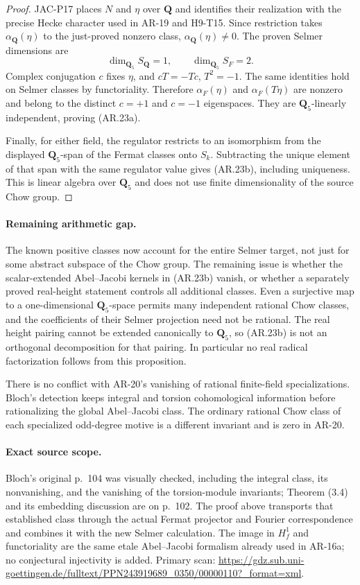 \begin{proof}
JAC-P17 places $N$ and $\eta$ over $\mathbf Q$ and identifies their
realization with the precise Hecke character used in AR-19 and
H9-T15.  Since restriction takes
$\alpha_{\mathbf Q}(\eta)$ to the just-proved nonzero class,
$\alpha_{\mathbf Q}(\eta)\ne0$.  The proven Selmer dimensions are
\[
 \dim_{\mathbf Q_5}S_{\mathbf Q}=1,\qquad
 \dim_{\mathbf Q_5}S_F=2.
\]
Complex conjugation $c$ fixes $\eta$, and $cT=-Tc$, $T^2=-1$.
The same identities hold on Selmer classes by functoriality.
Therefore $\alpha_F(\eta)$ and $\alpha_F(T\eta)$ are nonzero and
belong to the distinct $c=+1$ and $c=-1$ eigenspaces.  They are
$\mathbf Q_5$-linearly independent, proving (AR.23a).

Finally, for either field, the regulator restricts to an isomorphism
from the displayed $\mathbf Q_5$-span of the Fermat classes onto
$S_k$.  Subtracting the unique element of that span with the same
regulator value gives (AR.23b), including uniqueness.  This is
linear algebra over $\mathbf Q_5$ and does not use finite
dimensionality of the source Chow group.
\end{proof}

\paragraph{Remaining arithmetic gap.}
The known positive classes now account for the entire Selmer target,
not just for some abstract subspace of the Chow group.  The remaining
issue is whether the scalar-extended Abel--Jacobi kernels in
(AR.23b) vanish, or whether a separately proved real-height statement
controls all additional classes.  Even a surjective map to a
one-dimensional $\mathbf Q_5$-space permits many independent rational
Chow classes, and the coefficients of their Selmer projection need
not be rational.  The real height pairing cannot be extended
canonically to $\mathbf Q_5$, so (AR.23b) is not an orthogonal
decomposition for that pairing.  In particular no real radical
factorization follows from this proposition.

There is no conflict with AR-20's vanishing of rational finite-field
specializations.  Bloch's detection keeps integral and torsion
cohomological information before rationalizing the global
Abel--Jacobi class.  The ordinary rational Chow class of each
specialized odd-degree motive is a different invariant and is zero
in AR-20.

\paragraph{Exact source scope.}
Bloch's original p.~104 was visually checked, including the integral
class, its nonvanishing, and the vanishing of the torsion-module
invariants; Theorem (3.4) and its embedding discussion are on p.~102.
The proof above transports that established class through the actual
Fermat projector and Fourier correspondence and combines it with the
new Selmer calculation.  The image in $H^1_f$ and functoriality are
the same etale Abel--Jacobi formalism already used in AR-16a; no
conjectural injectivity is added.  Primary scan:
\url{https://gdz.sub.uni-goettingen.de/fulltext/PPN243919689_0350/00000110?_format=xml}.
